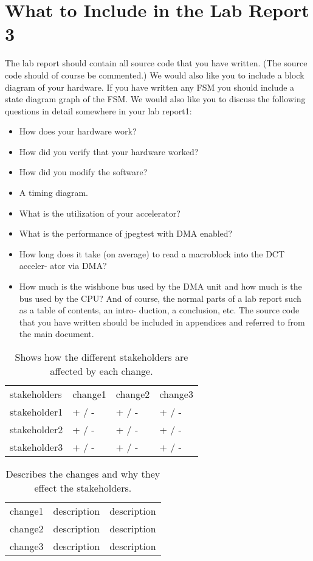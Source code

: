 \documentclass[a4paper]{article}
\begin{document}
\section{What to Include in the Lab Report 3}
The lab report should contain all source code that you have written. (The source code should of course be commented.) We would also like you to include a block diagram of your hardware. If you have written any FSM you should include a state diagram graph of the FSM.
We would also like you to discuss the following questions in detail somewhere in your lab report1:
\begin{itemize}
\item How does your hardware work?
\item How did you verify that your hardware worked?
\item How did you modify the software?
\item A timing diagram.
\item What is the utilization of your accelerator?
\item What is the performance of jpegtest with DMA enabled?
\item How long does it take (on average) to read a macroblock into the DCT acceler- ator via DMA?
\item How much is the wishbone bus used by the DMA unit and how much is the bus used by the CPU?
And of course, the normal parts of a lab report such as a table of contents, an intro- duction, a conclusion, etc. The source code that you have written should be included in appendices and referred to from the main document.
\end{itemize}


\begin{table}[h]
	\centering
 	\begin{tabular}{l l l l}
		stakeholders 			& change1 	& change2  	& change3 \\
		stakeholder1 			& + / -		& + / -		& + / - \\
		stakeholder2 			& + / -		& + / -		& + / - \\
		stakeholder3 			& + / -		& + / -		& + / - \\
	\end{tabular}
	
	\caption{Shows how the different stakeholders are affected by each change.}
	\label{tab:table1}
\end{table}

\begin{table}[h]
	\centering
 	\begin{tabular}{l l l}
	    change1 & description & description \\
	    change2 & description & description \\
	    change3 & description & description \\
	\end{tabular}
	
	\caption{Describes the changes and why they effect the stakeholders.}
	\label{tab:table1}
\end{table}
\end{document}
